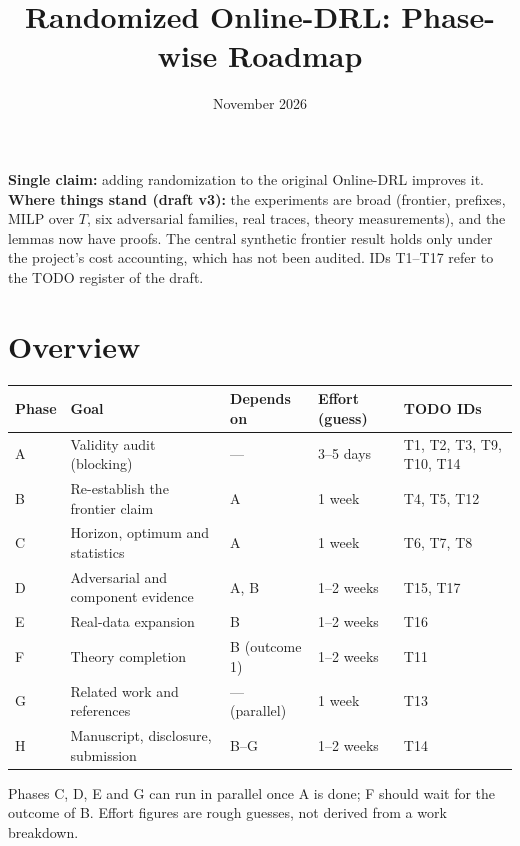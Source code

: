 \documentclass[11pt]{article}
\begin{document}
\title{Randomized Online-DRL: Phase-wise Roadmap}
\author{}
\date{November 2026}
\maketitle

\noindent\textbf{Single claim:} adding randomization to the original Online-DRL improves it.
\textbf{Where things stand (draft v3):} the experiments are broad (frontier, prefixes, MILP over $T$, six adversarial families, real traces, theory measurements), and the lemmas now have proofs. The central synthetic frontier result holds only under the project's cost accounting, which has not been audited. IDs T1--T17 refer to the TODO register of the draft.

\section*{Overview}
\begin{center}\small
\begin{tabular}{p{}p{}p{}p{}p{}}
\toprule
Phase & Goal & Depends on & Effort (guess) & TODO IDs\\
\midrule
A & Validity audit (blocking) & --- & 3--5 days & T1, T2, T3, T9, T10, T14\\
B & Re-establish the frontier claim & A & 1 week & T4, T5, T12\\
C & Horizon, optimum and statistics & A & 1 week & T6, T7, T8\\
D & Adversarial and component evidence & A, B & 1--2 weeks & T15, T17\\
E & Real-data expansion & B & 1--2 weeks & T16\\
F & Theory completion & B (outcome 1) & 1--2 weeks & T11\\
G & Related work and references & --- (parallel) & 1 week & T13\\
H & Manuscript, disclosure, submission & B--G & 1--2 weeks & T14\\
\bottomrule
\end{tabular}
\end{center}
Phases C, D, E and G can run in parallel once A is done; F should wait for the outcome of B. Effort figures are rough guesses, not derived from a work breakdown.

\end{document}
